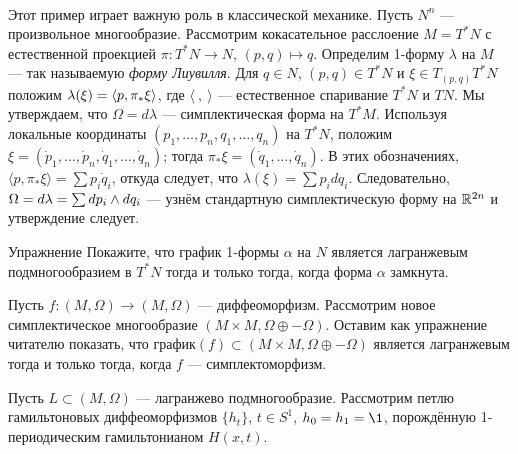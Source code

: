 \begin{ex}{}\label{3.1.C}\\ 
Этот пример играет важную роль в классической механике.
Пусть $N^n$ --- произвольное многообразие.
Рассмотрим кокасательное расслоение $M = T^\ast N$ с естественной
проекцией $\pi\colon T^\ast N \to N$, $(p, q) \mapsto q$.
Определим 1-форму $\lambda$ на $M$ --- так называемую \emph{форму Лиувилля}.
Для $q \in N$, $(p, q) \in T^\ast N$ и $\xi \in T_{(p, q)} T^\ast N$ положим $\lambda (\xi) \z= \langle p, \pi_\ast \xi \rangle$, где $\langle\ ,\ \rangle$ --- естественное спаривание $T^\ast N$ и $TN$.
Мы утверждаем, что $\Omega = d\lambda$ --- симплектическая форма на $T^\ast M$.
Используя локальные координаты $(p_1,\dots, p_n, q_1,\dots, q_n)$ на $T^\ast N$, положим $\xi = (\dot p_1 ,\dots, \dot p_n, \dot q_1,\dots,\dot q_n)$;
тогда $\pi_\ast \xi = (\dot q_1,\dots, \dot q_n)$.
В этих обозначениях, $\langle p, \pi_\ast \xi\rangle=\sum p_i \dot q_i$, откуда следует, что $\lambda (\xi) =\sum p_i dq_i$.
Следовательно, $\Omega = d\lambda =\sum dp_i \z\wedge dq_i$ --- узнём стандартную симплектическую форму на $\mathbb{R}^{2n}$ и утверждение следует.
\end{ex}


\begin{ex*}{Упражнение}
Покажите, что график 1-формы $\alpha$ на $N$ является лагранжевым подмногообразием в $T^\ast N$ тогда и только тогда, когда форма $\alpha$ замкнута.
\end{ex*}

\begin{ex}{}\label{3.1.D}
Пусть $f\colon (M, \Omega) \to (M, \Omega)$ --- диффеоморфизм.
Рассмотрим новое симплектическое многообразие $(M \times M, \Omega \oplus -\Omega)$.
Оставим как упражнение читателю показать, что график$(f) \subset (M \times M, \Omega \oplus -\Omega)$ является лагранжевым тогда и только тогда, когда $f$ --- симплектоморфизм.
\end{ex}

\begin{ex}{}\label{3.1.E}
Пусть $L \subset (M, \Omega)$ --- лагранжево подмногообразие.
Рассмотрим петлю гамильтоновых диффеоморфизмов $\{h_t\}$, $t \in S^1$, $h_0 = h_1 = \1$, порождённую 1-периодическим гамильтонианом $H (x, t)$.
\end{ex}

